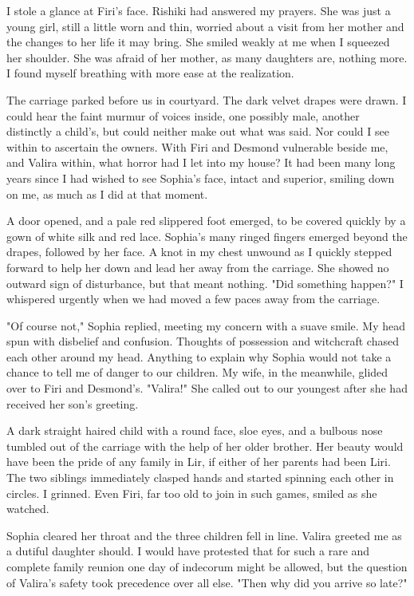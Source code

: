 \documentclass{article}
\begin{document}
I stole a glance at Firi's face. Rishiki had answered my prayers. She was just a young girl, still a little worn and thin, worried about a visit from her mother and the changes to her life it may bring. She smiled weakly at me when I squeezed her shoulder. She was afraid of her mother, as many daughters are, nothing more. I found myself breathing with more ease at the realization.

The carriage parked before us in courtyard. The dark velvet drapes were drawn. I could hear the faint murmur of voices inside, one possibly male, another distinctly a child's, but could neither make out what was said. Nor could I see within to ascertain the owners. With Firi and Desmond vulnerable beside me, and Valira within, what horror had I let into my house? It had been many long years since I had wished to see Sophia's face, intact and superior, smiling down on me, as much as I did at that moment.

A door opened, and a pale red slippered foot emerged, to be covered quickly by a gown of white silk and red lace. Sophia's many ringed fingers emerged beyond the drapes, followed by her face. A knot in my chest unwound as I quickly stepped forward to help her down and lead her away from the carriage. She showed no outward sign of disturbance, but that meant nothing. "Did something happen?" I whispered urgently when we had moved a few paces away from the carriage.

"Of course not," Sophia replied, meeting my concern with a suave smile. My head spun with disbelief and confusion. Thoughts of possession and witchcraft chased each other around my head. Anything to explain why Sophia would not take a chance to tell me of danger to our children. My wife, in the meanwhile, glided over to Firi and Desmond's. "Valira!" She called out to our youngest after she had received her son's greeting.

A dark straight haired child with a round face, sloe eyes, and a bulbous nose tumbled out of the carriage with the help of her older brother. Her beauty would have been the pride of any family in Lir, if either of her parents had been Liri. The two siblings immediately clasped hands and started spinning each other in circles. I grinned. Even Firi, far too old to join in such games, smiled as she watched.

Sophia cleared her throat and the three children fell in line. Valira greeted me as a dutiful daughter should. I would have protested that for such a rare and complete family reunion one day of indecorum might be allowed, but the question of Valira's safety took precedence over all else. "Then why did you arrive so late?"
\end{document}
